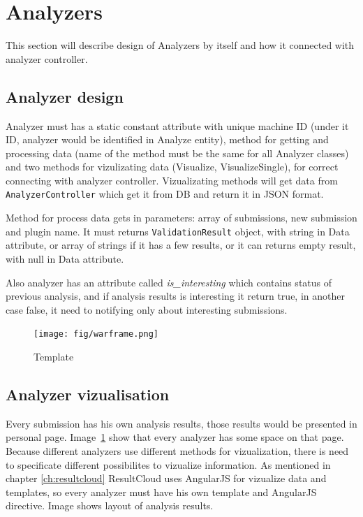 \section{Analyzers}

This section will describe design of Analyzers by itself and how it connected with analyzer controller.

\subsection{Analyzer design}

Analyzer must has a static constant attribute with unique machine ID (under it ID, analyzer would be identified in Analyze entity), method for getting and processing data (name of the method must be the same for all Analyzer classes) and two methods for vizulizating data (Visualize, VisualizeSingle), for correct connecting with analyzer controller. Vizualizating methods will get data from \texttt{AnalyzerController} which get it from DB and return it in JSON format.

Method for process data gets in parameters: array of submissions, new submission and plugin name. It must returns \texttt{ValidationResult} object, with string in Data attribute, or array of strings if it has a few results, or it can returns empty result, with null in Data attribute.

Also analyzer has an attribute called \emph{is\_interesting} which contains status of previous analysis, and if analysis results is interesting it return true, in another case false, it need to notifying only about interesting submissions.

\begin{figure}
  \centering
    \texttt{[image: fig/warframe.png]}
  \caption{Template}
  \label{fig:temp}
\end{figure}

\subsection{Analyzer vizualisation}

Every submission has his own analysis results, those results would be presented in personal page. Image\ \ref{fig:temp} show that every analyzer has some space on that page. Because different analyzers use different methods for vizualization, there is need to specificate different possibilites to vizualize information. As mentioned in chapter \ref{ch:resultcloud} ResultCloud uses AngularJS for vizualize data and templates, so every analyzer must have his own template and AngularJS  directive. Image shows layout of analysis results.

